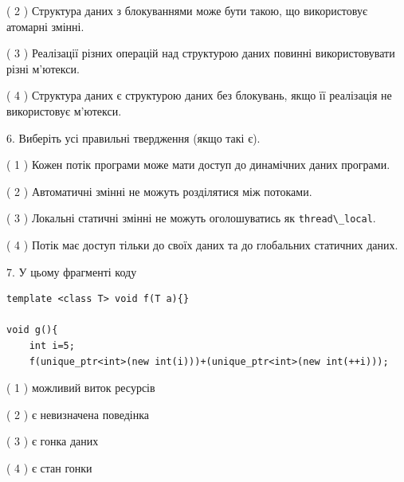 \documentclass[12pt, ukrainian]{article}
\def\code#1{\Verb!#1!}
\begin{document}
\begin {large}
{( 2 ) Структура даних з блокуваннями може бути такою, що використовує атомарні змінні.%

( 3 ) Реалізації різних операцій над структурою даних повинні використовувати різні м’ютекси.%

( 4 ) Структура даних є структурою даних без блокувань, якщо її реалізація не використовує м’ютекси.%
\newpage



\vspace{5mm}
6. Виберіть усі правильні твердження (якщо такі є).\par
\vspace{2mm}

( 1 ) Кожен потік програми може мати доступ до динамічних даних програми.%

( 2 ) Автоматичні змінні не можуть розділятися між потоками.%

( 3 ) Локальні статичні змінні не можуть оголошуватись як \code{thread\_local}.%

( 4 ) Потік має доступ тільки до своїх даних та до глобальних статичних даних.%


\vspace{5mm}
7. У цьому фрагменті коду
\begin{verbatim}
template <class T> void f(T a){}

void g(){
    int i=5;
    f(unique_ptr<int>(new int(i)))+(unique_ptr<int>(new int(++i)));
\end{verbatim}
( 1 ) можливий виток ресурсів%

( 2 ) є невизначена поведінка%

( 3 ) є гонка даних%

( 4 ) є стан гонки%
}
\end {large}
\end{document}
